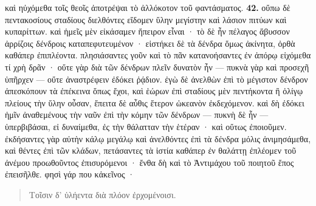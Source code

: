 \documentclass[a4paper, 11pt, oneside, polutonikogreek, german]{article}
\begin{document}
καὶ ηὐχόμεθα τοῖς θεοῖς ἀποτρέψαι τὸ ἀλλόκοτον τοῦ φαντάσματος. \textbf{42.} οὔπω δὲ πεντακοσίους σταδίους διελθόντες εἴδομεν ὕλην μεγίστην καὶ λάσιον πιτύων καὶ κυπαρίττων. καὶ ἡμεῖς μὲν εἰκάσαμεν ἤπειρον εἶναι · τὸ δὲ ἦν πέλαγος ἄβυσσον ἀρρίζοις δένδροις καταπεφυτευμένον · εἱστήκει δὲ τὰ δένδρα ὅμως ἀκίνητα, ὀρθὰ καθάπερ ἐπιπλέοντα. πλησιάσαντες γοῦν καὶ τὸ πᾶν κατανοήσαντες ἐν ἀπόρῳ εἰχόμεθα τί χρὴ δρᾶν · οὔτε γὰρ διὰ τῶν δένδρων πλεῖν δυνατὸν ἦν --- πυκνὰ γὰρ καὶ προσεχῆ ὑπῆρχεν --- οὔτε ἀναστρέφειν ἐδόκει ῥᾴδιον. ἐγὼ δὲ ἀνελθὼν ἐπὶ τὸ μέγιστον δένδρον ἀπεσκόπουν τὰ ἐπέκεινα ὅπως ἔχοι, καὶ ἑώρων ἐπὶ σταδίους μὲν πεντήκοντα ἢ ὀλίγῳ πλείους τὴν ὕλην οὖσαν, ἔπειτα δὲ αὖθις ἕτερον ὠκεανὸν ἐκδεχόμενον. καὶ δὴ ἐδόκει ἡμῖν ἀναθεμένους τὴν ναῦν ἐπὶ τὴν κόμην τῶν δένδρων --- πυκνὴ δὲ ἦν --- ὑπερβιβάσαι, εἰ δυναίμεθα, ἐς τὴν θάλατταν τὴν ἑτέραν · καὶ οὕτως ἐποιοῦμεν. ἐκδήσαντες γὰρ αὐτὴν κάλῳ μεγάλῳ καὶ ἀνελθόντες ἐπὶ τὰ δένδρα μόλις ἀνιμησάμεθα, καὶ θέντες ἐπὶ τῶν κλάδων, πετάσαντες τὰ ἱστία καθάπερ ἐν θαλάττῃ ἐπλέομεν τοῦ ἀνέμου προωθοῦντος ἐπισυρόμενοι · ἔνθα δὴ καὶ τὸ Ἀντιμάχου τοῦ ποιητοῦ ἔπος ἐπεισῆλθε. φησὶ γάρ που κἀκεῖνος ·
\begin{quote}
\small
Τοῖσιν δ' ὑλήεντα διὰ πλόον ἐρχομένοισι.
\end{quote}
\end{document}

